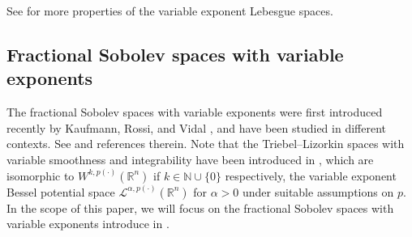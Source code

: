\documentclass[11pt]{amsart}
\theoremstyle{plain}
\theoremstyle{definition}
\numberwithin{equation}{section}
\begin{document}
See \cite{KR91,FZ01,DHHR11,CUF13} for more properties of the variable exponent Lebesgue spaces.












\subsection{Fractional Sobolev spaces with variable exponents} \label{sec:Sobolev}

The fractional Sobolev spaces with variable exponents were first introduced recently by Kaufmann, Rossi, and Vidal \cite{KRV17}, and have been studied in different contexts. See \cite{DPR17,Bah18,BR18,AHKC19,ABS19,BB19,HK19,ABS20,BRW20,BA20,CGA20,ZZ20,ASSA21,ABSS21,BT21,HK21,ZAF21} and references therein. Note that the Triebel--Lizorkin spaces with variable smoothness and integrability have been introduced in \cite{DHR09}, which are isomorphic to $W^{k, p(\cdot)}(\mathbb{R}^n)$ if $k \in \mathbb{N} \cup \lbrace 0 \rbrace$ respectively, the variable exponent Bessel potential space $\mathcal{L}^{\alpha, p(\cdot)}(\mathbb{R}^n)$ for $\alpha > 0$ under suitable assumptions on $p$. In the scope of this paper, we will focus on the fractional Sobolev spaces with variable exponents introduce in \cite{KRV17}.
\end{document}
